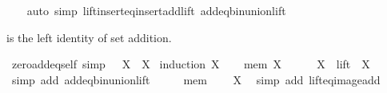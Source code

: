 \begin{isabellebody}
%
\isadelimproof
\ \ %
\endisadelimproof
%
\isatagproof
{}\isamarkupfalse%
\ {\isacharparenleft}{\kern0pt}auto\ simp{\isacharcolon}{\kern0pt}\ lift{\isacharunderscore}{\kern0pt}insert{\isacharunderscore}{\kern0pt}eq{\isacharunderscore}{\kern0pt}insert{\isacharunderscore}{\kern0pt}add{\isacharunderscore}{\kern0pt}lift\ add{\isacharunderscore}{\kern0pt}eq{\isacharunderscore}{\kern0pt}bin{\isacharunderscore}{\kern0pt}union{\isacharunderscore}{\kern0pt}lift{\isacharparenright}{\kern0pt}%
\endisatagproof
{\isafoldproof}%
%
\isadelimproof
%
\endisadelimproof
%
\isadelimdocument
%
\endisadelimdocument
%
\isatagdocument
%
\isamarkuptrue%
%
\endisatagdocument
{\isafolddocument}%
%
\isadelimdocument
%
\endisadelimdocument
%
\begin{isamarkuptext}%
 is the left identity of set addition.%
\end{isamarkuptext}\isamarkuptrue%
\isamarkupfalse%
\ zero{\isacharunderscore}{\kern0pt}add{\isacharunderscore}{\kern0pt}eq{\isacharunderscore}{\kern0pt}self\ {\isacharbrackleft}{\kern0pt}simp{\isacharbrackright}{\kern0pt}{\isacharcolon}{\kern0pt}\ {\isachardoublequoteopen}{}\ {\isacharplus}{\kern0pt}\ X\ {\isacharequal}{\kern0pt}\ X{\isachardoublequoteclose}\isanewline
%
\isadelimproof
%
\endisadelimproof
%
\isatagproof
{}\isamarkupfalse%
\ {\isacharparenleft}{\kern0pt}induction\ X{\isacharparenright}{\kern0pt}\isanewline
\ \ \isamarkupfalse%
\ {\isacharparenleft}{\kern0pt}mem\ X{\isacharparenright}{\kern0pt}\isanewline
\ \ \isamarkupfalse%
\ {\isachardoublequoteopen}{}\ {\isacharplus}{\kern0pt}\ X\ {\isacharequal}{\kern0pt}\ lift\ {}\ X{\isachardoublequoteclose}\ \isamarkupfalse%
\ {\isacharparenleft}{\kern0pt}simp\ add{\isacharcolon}{\kern0pt}\ add{\isacharunderscore}{\kern0pt}eq{\isacharunderscore}{\kern0pt}bin{\isacharunderscore}{\kern0pt}union{\isacharunderscore}{\kern0pt}lift{\isacharparenright}{\kern0pt}\isanewline
\ \ \isamarkupfalse%
\ \isamarkupfalse%
\ mem\ \isamarkupfalse%
\ {\isachardoublequoteopen}{\isachardot}{\kern0pt}{\isachardot}{\kern0pt}{\isachardot}{\kern0pt}\ {\isacharequal}{\kern0pt}\ X{\isachardoublequoteclose}\ \isamarkupfalse%
\ {\isacharparenleft}{\kern0pt}simp\ add{\isacharcolon}{\kern0pt}\ lift{\isacharunderscore}{\kern0pt}eq{\isacharunderscore}{\kern0pt}image{\isacharunderscore}{\kern0pt}add{\isacharparenright}{\kern0pt}\isanewline

\end{isabellebody}
